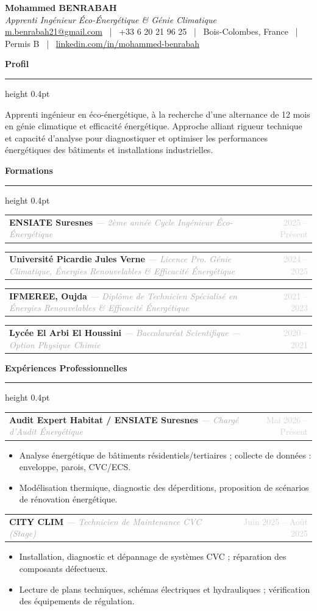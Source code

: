 \documentclass[9pt, a4paper]{article}
\makeatletter
\newcommand{\cvsection}[1]{%
  \vspace{3pt}
  {\normalsize \textbf{\textcolor{accentblue}{#1}}}
  \vspace{1pt}
  \hrule height 0.4pt
  \vspace{3pt}
}
\newcommand{\cventry}[3]{%
  \begin{tabularx}{\linewidth}{@{}X r@{}}
    \textbf{#1} \textit{\textcolor{darkgray}{ --- #2}} & \textcolor{lightgray}{\small #3}
  \end{tabularx}\vspace{-1pt}
}
\makeatother
\begin{document}
\begin{center}
  {\LARGE \textbf{Mohammed BENRABAH}} \\[2pt]
  {\normalsize \textit{\textcolor{accentblue}{Apprenti Ingénieur Éco-Énergétique \& Génie Climatique}}} \\[3pt]
  {\small
    \href{mailto:m.benrabah21@gmail.com}{m.benrabah21@gmail.com}
    ~|~ +33 6 20 21 96 25
    ~|~ Bois-Colombes, France
    ~|~ Permis B
    ~|~ \href{https://linkedin.com/in/mohammed-benrabah}{linkedin.com/in/mohammed-benrabah}
  }
\end{center}
\vspace{20pt}

\cvsection{Profil}
Apprenti ingénieur en éco-énergétique, à la recherche d'une alternance de 12 mois en génie climatique et efficacité énergétique. Approche alliant rigueur technique et capacité d'analyse pour diagnostiquer et optimiser les performances énergétiques des bâtiments et installations industrielles.

\vspace{5pt}
\cvsection{Formations}
\cventry{ENSIATE Suresnes}{2ème année Cycle Ingénieur Éco-Énergétique}{2025 -- Présent}
\cventry{Université Picardie Jules Verne}{Licence Pro. Génie Climatique, Énergies Renouvelables \& Efficacité Énergétique}{2024 -- 2025}
\cventry{IFMEREE, Oujda}{Diplôme de Technicien Spécialisé en Énergies Renouvelables \& Efficacité Énergétique}{2021 -- 2023}
\cventry{Lycée El Arbi El Houssini}{Baccalauréat Scientifique — Option Physique Chimie}{2020 -- 2021}

\vspace{5pt}
\cvsection{Expériences Professionnelles}

\cventry{Audit Expert Habitat / ENSIATE Suresnes}{Chargé d'Audit Énergétique}{Mai 2026 -- Présent}
\begin{itemize}[leftmargin=1em, itemsep=0pt, topsep=1pt, parsep=0pt, label={---}]
  \item Analyse énergétique de bâtiments résidentiels/tertiaires ; collecte de données : enveloppe, parois, CVC/ECS.
  \item Modélisation thermique, diagnostic des déperditions, proposition de scénarios de rénovation énergétique.
\end{itemize}

\vspace{2pt}
\cventry{CITY CLIM}{Technicien de Maintenance CVC (Stage)}{Juin 2025 -- Août 2025}
\begin{itemize}[leftmargin=1em, itemsep=0pt, topsep=1pt, parsep=0pt, label={---}]
  \item Installation, diagnostic et dépannage de systèmes CVC ; réparation des composants défectueux.
  \item Lecture de plans techniques, schémas électriques et hydrauliques ; vérification des équipements de régulation.
\end{itemize}
\end{document}
